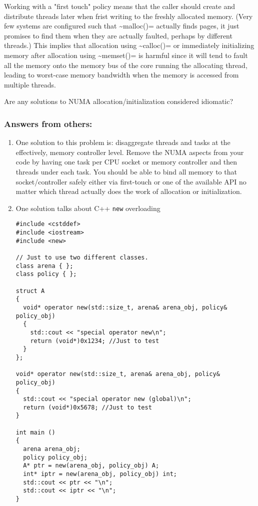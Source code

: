 \documentclass[11pt]{article}
\begin{document}
Working with a "first touch" policy means that the caller should create and distribute threads later when frist writing to the freshly allocated memory. (Very few systems are configured such that \textasciitilde{}malloc()= actually finds pages, it just promises to find them when they are actually faulted, perhaps by different threads.) This implies that allocation using \textasciitilde{}calloc()= or immediately initializing memory after allocation using \textasciitilde{}memset()= is harmful since it will tend to fault all the memory onto the memory bus of the core running the allocating thread, leading to worst-case memory bandwidth when the memory is accessed from multiple threads.

Are any solutions to NUMA allocation/initialization considered idiomatic?

\subsubsection{Answers from others:}
\label{sec-7-2-2}
\begin{enumerate}
\item One solution to this problem is: disaggregate threads and tasks at the effectively, memory controller level.
\label{sec-7-2-2-1}
Remove the NUMA aspects from your code by having one task per CPU socket or memory controller and then threads under each task. You should be able to bind all memory to that socket/controller safely either via first-touch or one of the available API no matter which thread actually does the work of allocation or initialization.

\item One solution talks about C++ \verb~new~ overloading
\label{sec-7-2-2-2}
\begin{verbatim}
#include <cstddef>
#include <iostream>
#include <new>

// Just to use two different classes.
class arena { };
class policy { };

struct A
{
  void* operator new(std::size_t, arena& arena_obj, policy& policy_obj)
  {
    std::cout << "special operator new\n";
    return (void*)0x1234; //Just to test
  }
};

void* operator new(std::size_t, arena& arena_obj, policy& policy_obj)
{
  std::cout << "special operator new (global)\n";
  return (void*)0x5678; //Just to test
}

int main ()
{
  arena arena_obj;
  policy policy_obj;
  A* ptr = new(arena_obj, policy_obj) A;
  int* iptr = new(arena_obj, policy_obj) int;
  std::cout << ptr << "\n";
  std::cout << iptr << "\n";
}
\end{verbatim}
\end{enumerate}
\end{document}
